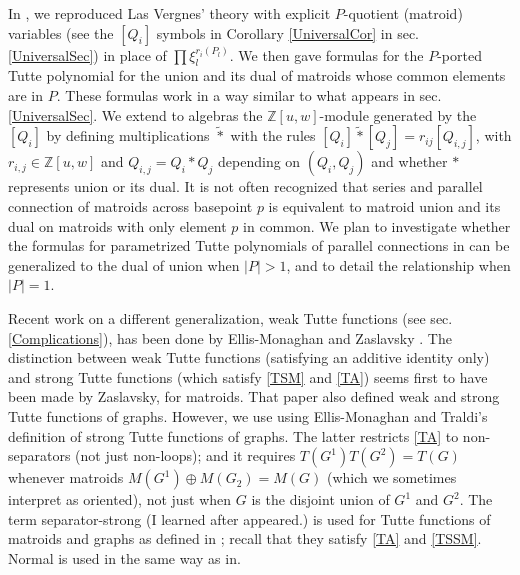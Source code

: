 \documentclass[12pt,leqno]{amsart}
\theoremstyle{remark}
\begin{document}
In \cite{sdcPorted}, we
reproduced Las Vergnes' theory with explicit $P$-quotient (matroid)
variables (see the $[Q_i]$ symbols in Corollary \ref{UniversalCor}
in sec. \ref{UniversalSec}) in place of 
$\prod\xi_l^{r_i(P_l)}$.  We then
gave formulas for the $P$-ported Tutte polynomial for the
union and its dual of matroids whose common elements are in $P$.
These formulas  work in a way similar to what appears in
sec. \ref{UniversalSec}.
We extend to algebras
the $\mathbb{Z}[u,w]$-module
generated by the $[Q_i]$ by defining multiplications 
$\tilde{*}$ with the rules
$[Q_i]\tilde{*}[Q_j]=r_{ij}[Q_{i,j}]$, with $r_{i,j}\in\mathbb{Z}[u,w]$ and
$Q_{i,j}=Q_i*Q_j$ depending on $(Q_i,Q_j)$ and whether $*$ represents 
union or its dual.  It is not often recognized that series and parallel
connection of matroids across basepoint $p$ 
is equivalent to matroid union and its dual on matroids with only
element $p$ in common.  We plan to investigate whether the formulas
for parametrized Tutte polynomials of parallel connections
in \cite{Ellis-Monaghan-Traldi} can be generalized to the dual
of union when $|P|>1$, and to detail the relationship when $|P|=1$.

Recent work on a different generalization, weak Tutte functions
(see sec. \ref{Complications}), has been done by 
Ellis-Monaghan and Zaslavsky \cite{ZaslavskyOct18}.
The distinction between weak Tutte functions (satisfying
an additive identity only)
and strong Tutte functions
(which satisfy \eqref{TSM} and \eqref{TA}) seems first to
have been made by Zaslavsky\cite{MR93a:05047}, for matroids.
That paper also defined weak and strong Tutte functions of
graphs.  However, we use using Ellis-Monaghan and Traldi's
definition of strong Tutte functions of 
graphs\cite{Ellis-Monaghan-Traldi}.
The latter restricts \eqref{TA} to non-separators (not just 
non-loops);  and it 
requires $T(G^1)T(G^2)=T(G)$ whenever 
matroids $M(G^1)\oplus M(G_2)=M(G)$ 
(which we sometimes interpret as oriented), not just when
$G$ is the disjoint union of $G^1$ and $G^2$.
The term separator-strong 
(I learned\cite{JoAndTom} 
after \cite{Ellis-Monaghan-Traldi} appeared.)
is used for Tutte functions of matroids and graphs 
as defined in \cite{Ellis-Monaghan-Traldi}; recall that
they satisfy \eqref{TA} and \eqref{TSSM}.
Normal is used in the same way as in\cite{MR93a:05047}.
\end{document}
